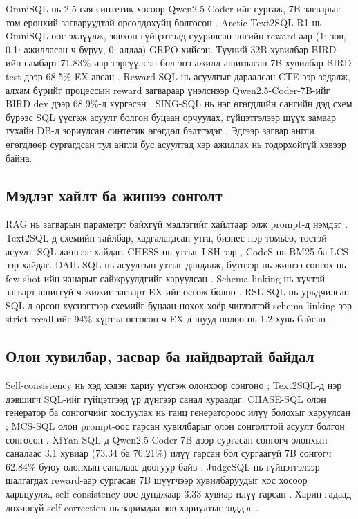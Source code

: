 OmniSQL нь 2.5 сая синтетик хосоор Qwen2.5-Coder-ийг сургаж, 7B загварыг том ерөнхий загваруудтай өрсөлдөхүйц болгосон
\cite{li_2025_omnisql, hui_2024_qwen25_coder}. Arctic-Text2SQL-R1 нь OmniSQL-оос эхлүүлж, зөвхөн гүйцэтгэлд суурилсан
энгийн reward-аар (1: зөв, 0.1: ажилласан ч буруу, 0: алдаа) GRPO \cite{shao_2024_deepseekmath} хийсэн. Түүний 32B
хувилбар BIRD-ийн самбарт 71.83\%-иар тэргүүлсэн бол энэ ажилд ашигласан 7B хувилбар BIRD test дээр 68.5\% EX авсан
\cite{yao_2025_arctic_text2sql_r1}. Reward-SQL нь асуулгыг дараалсан CTE-ээр задалж, алхам бүрийг процессын reward
загвараар үнэлснээр Qwen2.5-Coder-7B-ийг BIRD dev дээр 68.9\%-д хүргэсэн \cite{zhang_2025_reward_sql}. SING-SQL нь нэг
өгөгдлийн сангийн дэд схем бүрээс SQL үүсгэж асуулт болгон буцаан орчуулах, гүйцэтгэлээр шүүх замаар тухайн DB-д
зориулсан синтетик өгөгдөл бэлтгэдэг \cite{caferoglu_2025_sing_sql}. Эдгээр загвар англи өгөгдлөөр сургагдсан тул англи бус асуултад хэр ажиллах нь
тодорхойгүй хэвээр байна.

\subsection{Мэдлэг хайлт ба жишээ сонголт}

RAG нь загварын параметрт байхгүй мэдлэгийг хайлтаар олж prompt-д нэмдэг \cite{lewis_2020_rag}. Text2SQL-д схемийн
тайлбар, хадгалагдсан утга, бизнес нэр томьёо, төстэй асуулт--SQL жишээг хайдаг. CHESS нь утгыг LSH-ээр
\cite{talaei_2024_chess}, CodeS нь BM25 ба LCS-ээр \cite{li_2024_codes} хайдаг. DAIL-SQL нь асуултын утгыг далдалж,
бүтцээр нь жишээ сонгох нь few-shot-ийн чанарыг сайжруулдгийг харуулсан \cite{gao_2024_dail_sql}. Schema linking нь
хүчтэй загварт ашиггүй ч жижиг загварт EX-ийг өсгөж болно \cite{maamari_2024_death_schema_linking}. RSL-SQL нь
урьдчилсан SQL-д орсон хүснэгтээр схемийг буцаан нөхөх хоёр чиглэлтэй schema linking-ээр strict recall-ийг 94\% хүртэл
өсгөсөн ч EX-д шууд нөлөө нь 1.2 хувь байсан \cite{cao_2024_rsl_sql}.

\subsection{Олон хувилбар, засвар ба найдвартай байдал}

Self-consistency нь хэд хэдэн хариу үүсгэж олонхоор сонгоно \cite{wang_2023_self_consistency}; Text2SQL-д нэр дэвшигч
SQL-ийг гүйцэтгээд үр дүнгээр санал хураадаг. CHASE-SQL олон генератор ба сонгогчийг хослуулах нь ганц генератороос илүү
болохыг харуулсан \cite{pourreza_2024_chase_sql}; MCS-SQL олон prompt-оос гарсан хувилбарыг олон сонголттой асуулт
болгон сонгосон \cite{lee_2025_mcs_sql}. XiYan-SQL-д Qwen2.5-Coder-7B дээр сургасан сонгогч олонхын саналаас 3.1 хувиар
(73.34 ба 70.21\%) илүү гарсан бол сургаагүй 7B сонгогч 62.84\% буюу олонхын саналаас доогуур байв
\cite{liu_2025_xiyan_sql}. JudgeSQL нь гүйцэтгэлээр шалгагдах reward-аар сургасан 7B шүүгчээр хувилбаруудыг хос хосоор
харьцуулж, self-consistency-оос дунджаар 3.33 хувиар илүү гарсан \cite{bai_2025_judgesql}. Харин гадаад дохиогүй
self-correction нь заримдаа зөв хариултыг эвддэг \cite{huang_2024_self_correct}.

